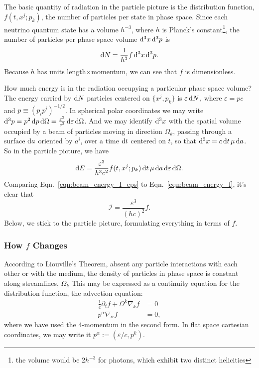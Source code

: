 The basic quantity of radiation in the particle picture is the distribution
function, $f(t,x^j;p_k)$, the number of particles per state in phase space.
Since each neutrino quantum state has a volume $h^{-3}$, where $h$ is Planck's
constant\footnote{the volume would be $2h^{-3}$ for photons, which exhibit two
distinct helicities},
the number of particles per phase space volume $\mathrm{d}^3x\,\mathrm{d}^3p$ is
\begin{equation}
  \label{eqn:dN_flatspace}
  \mathrm{d} N = \frac{1}{h^3} f \,\mathrm{d}^3 x\, \mathrm{d}^3p.
\end{equation}
Because $h$ has units length$\times$momentum, we can see that $f$ is
dimensionless.

How much energy is in the radiation occupying a particular phase space volume?
The energy carried by $\mathrm{d} N$ particles centered on $\{x^j,p_k\}$
is $\varepsilon\,\mathrm{d} N$,
where $\varepsilon=pc$ and $p\equiv (p_ip^i)^{-1/2}$.
In spherical polar coordinates we may write
$\mathrm{d}^3p=p^2\,\mathrm{d} p\,\mathrm{d}\Omega=\frac{\varepsilon^2}{c^3}\,\mathrm{d}\varepsilon\,\mathrm{d}\Omega$.
And we may identify $\mathrm{d}^3x$
with the spatial volume occupied by a beam of particles
moving in direction $\Omega_k$,
passing through a surface $\mathrm{d} a$
oriented by $a^i$,
over a time $\mathrm{d} t$ centered on $t$,
so that $\mathrm{d}^3x=c\,\mathrm{d} t\,\mu\,\mathrm{d} a$.
So in the particle picture, we have
\begin{equation}
  \label{eqn:beam_energy_f}
  \mathrm{d} E = \frac{\varepsilon^3}{h^3c^2} f(t,x^j;p_k)\,
  \mathrm{d} t\,\mu\,\mathrm{d} a\, \mathrm{d}\varepsilon\,\mathrm{d}\Omega.
\end{equation}
Comparing Eqn.~\ref{eqn:beam_energy_I_eps} to Eqn.~\ref{eqn:beam_energy_f},
it's clear that
\begin{equation}
  \mathcal{I}=\frac{\varepsilon^3}{(hc)^2}f. \nonumber
\end{equation}
Below, we stick to the particle picture, formulating everything in terms of $f$.

\subsubsection{How $f$ Changes}
According to Liouville's Theorem,
absent any particle interactions with each other or with the medium, the density
of particles in phase space is constant along streamlines, $\Omega_k$ This may be
expressed as a continuity equation for the distribution function,
the advection equation:
\begin{align}
  \frac{1}{c}\partial_t f + \Omega^k\nabla_k f &= 0 \\
  \label{eqn:f_advection}
  p^\alpha\nabla_\alpha f &= 0,
\end{align}
where we have used the 4-momentum in the second form. In flat space cartesian
coordinates, we may write it $p^\alpha:=(\varepsilon/c,p^k)$.

